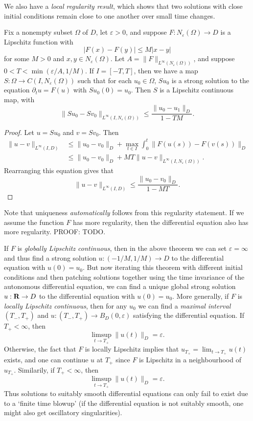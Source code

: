 We also have a \emph{local regularity result}, which shows that two solutions with close initial conditions remain close to one another over small time changes.

\begin{theorem}
    Fix a nonempty subset $\Omega$ of $D$, let $\varepsilon > 0$, and suppose $F: N_\varepsilon(\Omega) \to D$ is a Lipschitz function with
    \[ |F(x) - F(y)| \leq M |x - y| \]
    for some $M > 0$ and $x,y \in N_\varepsilon(\Omega)$. Let $A = \| F \|_{L^\infty(N_\varepsilon(\Omega))}$, and suppose $0 < T < \min(\varepsilon/A,1/M)$. If $I = [-T,T]$, then we have a map $S: \Omega \to C(I,N_\varepsilon(\Omega))$ such that for each $u_0 \in \Omega$, $Su_0$ is a strong solution to the equation $\partial_t u = F(u)$ with $Su_0(0) = u_0$. Then $S$ is a Lipschitz continuous map, with
    \[ \| Su_0 - Sv_0 \|_{L^\infty(I,N_\varepsilon(\Omega))} \leq \frac{\| u_0 - u_1 \|_D}{1 - TM}. \]
\end{theorem}
\begin{proof}
    Let $u = Su_0$ and $v = Sv_0$. Then
    \begin{align*}
        \| u - v \|_{L^\infty(I,D)} &\leq \| u_0 - v_0 \|_D + \max_{t \in I} \int_0^t \| F(u(s)) - F(v(s)) \|_D\\
        &\leq \| u_0 - v_0 \|_D + MT \| u - v \|_{L^\infty(I,N_\varepsilon(\Omega))}.
    \end{align*}
    Rearranging this equation gives that
    \[ \| u - v \|_{L^\infty(I,D)} \leq \frac{\| u_0 - v_0 \|_D}{1 - MT}. \]
\end{proof}

Note that uniqueness \emph{automatically} follows from this regularity statement. If we assume the function $F$ has more regularity, then the differential equation also has more regularity. PROOF: TODO.

If $F$ is \emph{globally Lipschitz continuous}, then in the above theorem we can set $\varepsilon = \infty$ and thus find a strong solution $u: (-1/M,1/M) \to D$ to the differential equation with $u(0) = u_0$. But now iterating this theorem with different initial conditions and then patching solutions together using the time invariance of the autonomous differential equation, we can find a unique global strong solution $u: \operatorname{\mathbf{R}} \to D$ to the differential equation with $u(0) = u_0$. More generally, if $F$ is \emph{locally Lipschitz continuous}, then for any $u_0$ we can find a \emph{maximal interval} $(T_-,T_+)$ and $u: (T_-,T_+) \to B_D(0,\varepsilon)$ satisfying the differential equation. If $T_+ < \infty$, then
%
\[ \limsup_{t \to T_+} \| u(t) \|_D = \varepsilon. \]
%
Otherwise, the fact that $F$ is locally Lipschitz implies that $u_{T_+} = \lim_{t \to T_+} u(t)$ exists, and one can continue $u$ at $T_+$ since $F$ is Lipschitz in a neighbourhood of $u_{T_+}$. Similarily, if $T_+ < \infty$, then
%
\[ \limsup_{t \to T_+} \| u(t) \|_D = \varepsilon. \]
%
Thus solutions to suitably smooth differential equations can only fail to exist due to a `finite time blowup' (if the differential equation is not suitably smooth, one might also get oscillatory singularities).

